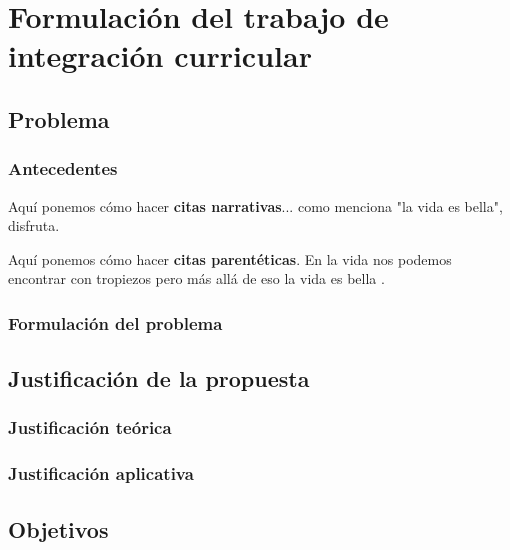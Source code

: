 \chapter{Formulación del trabajo de integración curricular} %

\section{Problema}


\subsection{Antecedentes}
Aquí ponemos cómo hacer \textbf{citas narrativas}... como menciona \textcite{yaqoob2016BDfuture} "la vida es bella", disfruta.

Aquí ponemos cómo hacer \textbf{citas parentéticas}. En la vida nos podemos encontrar con tropiezos pero más allá de eso la vida es bella \parencite{yaqoob2016BDfuture}.
 


\subsection{Formulación del problema}
% 

\section{Justificación de la propuesta}

\subsection{Justificación teórica}


\subsection{Justificación aplicativa}

\section{Objetivos}

